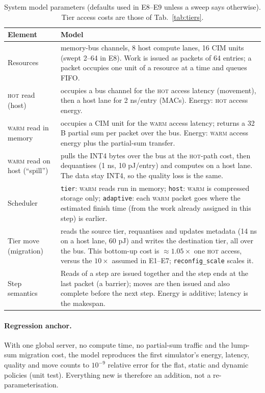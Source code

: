\documentclass[10pt,a4paper]{article}
\newcommand{\hot}{\textsc{hot}}
\newcommand{\warm}{\textsc{warm}}
\begin{document}
\begin{table}[t]
\centering\small
\caption{System model parameters (defaults used in E8--E9 unless a sweep says otherwise). Tier access costs are those of Tab.~\ref{tab:tiers}.}
\label{tab:sys}
\begin{tabular}{>{\raggedright\arraybackslash}p{3.6cm}>{\raggedright\arraybackslash}p{11.8cm}}
\toprule
Element & Model\\
\midrule
Resources & 8 memory-bus channels, 8 host compute lanes, 16 CIM units (swept 2--64 in E8). Work is issued as packets of 64 entries; a packet occupies one unit of a resource at a time and queues FIFO.\\
\hot{} read (host) & occupies a bus channel for the \hot{} access latency (movement), then a host lane for 2 ns/entry (MACs). Energy: \hot{} access energy.\\
\warm{} read in memory & occupies a CIM unit for the \warm{} access latency; returns a 32 B partial sum per packet over the bus. Energy: \warm{} access energy plus the partial-sum transfer.\\
\warm{} read on host (``spill'') & pulls the INT4 bytes over the bus at the \hot{}-path cost, then dequantises (1 ns, 10 pJ/entry) and computes on a host lane. The data stay INT4, so the quality loss is the same.\\
Scheduler & \texttt{tier}: \warm{} reads run in memory; \texttt{host}: \warm{} is compressed storage only; \texttt{adaptive}: each \warm{} packet goes where the estimated finish time (from the work already assigned in this step) is earlier.\\
Tier move (migration) & reads the source tier, requantises and updates metadata (14 ns on a host lane, 60 pJ) and writes the destination tier, all over the bus. This bottom-up cost is $\approx\!1.05\times$ one \hot{} access, versus the $10\times$ assumed in E1--E7; \texttt{reconfig\_scale} scales it.\\
Step semantics & Reads of a step are issued together and the step ends at the last packet (a barrier); moves are then issued and also complete before the next step. Energy is additive; latency is the makespan.\\
\bottomrule
\end{tabular}
\end{table}

\paragraph{Regression anchor.} With one global server, no compute time, no partial-sum traffic and the lump-sum migration cost, the model reproduces the first simulator's energy, latency, quality and move counts to $10^{-9}$ relative error for the flat, static and dynamic policies (unit test). Everything new is therefore an addition, not a re-parameterisation.
\end{document}
